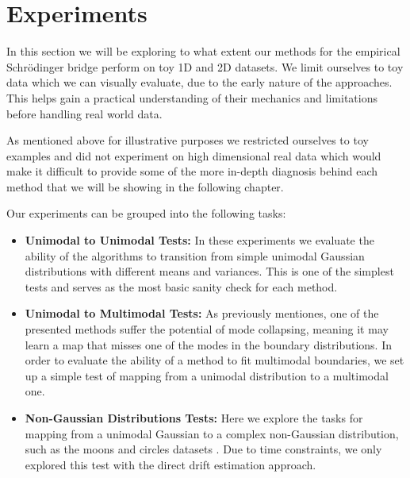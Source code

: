 \documentclass[a4paper,12pt,twoside,openright]{report}
\theoremstyle{definition}
\begin{document}
\chapter{Experiments}

In this section we will be exploring to what extent our methods for the empirical Schrödinger bridge perform on toy 1D and 2D datasets. We limit ourselves to toy data which we can visually evaluate, due to the early nature of the approaches. This helps gain a practical understanding of their mechanics and limitations before handling real world data. 

As mentioned above for illustrative purposes we restricted ourselves to toy examples and did not experiment on high dimensional real data which would make it difficult to provide some of the more in-depth diagnosis behind each method that we will be showing in the following chapter.

Our experiments can be grouped into the following tasks:
\begin{itemize}
    \item \textbf{Unimodal to Unimodal Tests:} In these experiments we evaluate the ability of the algorithms to transition from simple unimodal Gaussian distributions with different means and variances. This is one of the simplest tests and serves as the most basic sanity check for each method.
    \item \textbf{Unimodal to Multimodal Tests:} As previously mentiones, one of the presented methods suffer the potential of mode collapsing, meaning it may learn a map that misses one of the modes in the boundary distributions. In order to evaluate the ability of a method to fit multimodal boundaries, we set up a simple test of mapping from a unimodal distribution to a multimodal one. 
    \item \textbf{Non-Gaussian Distributions Tests:} Here we explore the tasks for mapping from a unimodal Gaussian to a complex non-Gaussian distribution, such as the moons and circles datasets \cite{pedregosa2011scikit}. Due to time constraints, we only explored this test with the direct drift estimation approach.
\end{itemize}
\end{document}
